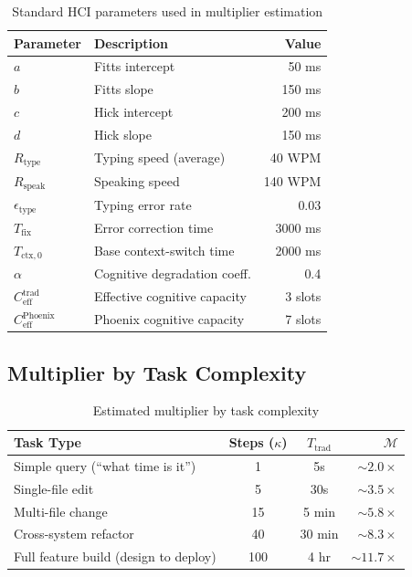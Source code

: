 \documentclass[11pt, a4paper]{article}
\begin{document}
\begin{table}[h]
\centering
\begin{tabular}{@{}llr@{}}
\toprule
\textbf{Parameter} & \textbf{Description} & \textbf{Value} \\
\midrule
$a$ & Fitts intercept & 50 ms \\
$b$ & Fitts slope & 150 ms \\
$c$ & Hick intercept & 200 ms \\
$d$ & Hick slope & 150 ms \\
$R_{\text{type}}$ & Typing speed (average) & 40 WPM \\
$R_{\text{speak}}$ & Speaking speed & 140 WPM \\
$\epsilon_{\text{type}}$ & Typing error rate & 0.03 \\
$T_{\text{fix}}$ & Error correction time & 3000 ms \\
$T_{\text{ctx},0}$ & Base context-switch time & 2000 ms \\
$\alpha$ & Cognitive degradation coeff. & 0.4 \\
$C_{\text{eff}}^{\text{trad}}$ & Effective cognitive capacity & 3 slots \\
$C_{\text{eff}}^{\text{Phoenix}}$ & Phoenix cognitive capacity & 7 slots \\
\bottomrule
\end{tabular}
\caption{Standard HCI parameters used in multiplier estimation}
\label{tab:params}
\end{table}

\subsection{Multiplier by Task Complexity}

\begin{table}[h]
\centering
\begin{tabular}{@{}lccr@{}}
\toprule
\textbf{Task Type} & \textbf{Steps ($\kappa$)} & \textbf{$T_{\text{trad}}$} & \textbf{$\mathcal{M}$} \\
\midrule
Simple query (``what time is it'')       & 1   & 5s     & $\sim\!2.0\times$ \\
Single-file edit                         & 5   & 30s    & $\sim\!3.5\times$ \\
Multi-file change                        & 15  & 5 min  & $\sim\!5.8\times$ \\
Cross-system refactor                    & 40  & 30 min & $\sim\!8.3\times$ \\
Full feature build (design to deploy)    & 100 & 4 hr   & $\sim\!11.7\times$ \\
\bottomrule
\end{tabular}
\caption{Estimated multiplier by task complexity}
\label{tab:multipliers}
\end{table}
\end{document}
